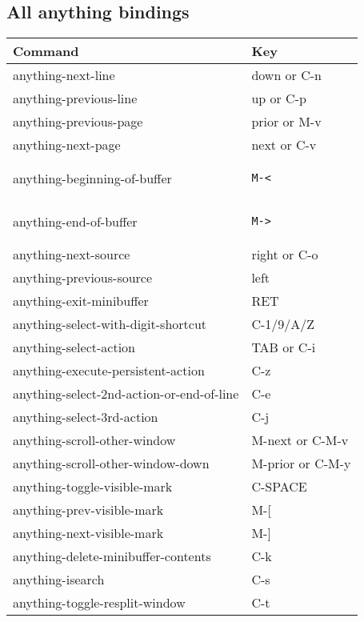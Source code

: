 \documentclass[a4paper,11pt]{article}
\begin{document}
\subsection{All anything bindings}
\label{sec:all-anyth-bind}

\begin{tabular}{| l | m{5cm} |}
  \hline
  Command & Key \\
  \hline
  anything-next-line & down or C-n \\
  \hline
  anything-previous-line & up or C-p \\
  \hline
  anything-previous-page & prior or M-v \\
  \hline
  anything-next-page & next or C-v \\
  \hline
  anything-beginning-of-buffer & 
\begin{verbatim}
M-<
\end{verbatim}
  \\
  \hline
  anything-end-of-buffer &
\begin{verbatim}
M->
\end{verbatim}
  \\
  \hline
  anything-next-source & right or C-o \\
  \hline
  anything-previous-source & left \\
  \hline
  anything-exit-minibuffer & RET \\
  \hline
  anything-select-with-digit-shortcut & C-1/9/A/Z \\
  \hline
  anything-select-action & TAB or C-i \\
  \hline
  anything-execute-persistent-action & C-z \\
  \hline
  anything-select-2nd-action-or-end-of-line & C-e \\
  \hline
  anything-select-3rd-action & C-j \\
  \hline
  anything-scroll-other-window & M-next or C-M-v \\
  \hline
  anything-scroll-other-window-down & M-prior or C-M-y \\
  \hline
  anything-toggle-visible-mark & C-SPACE \\
  \hline
  anything-prev-visible-mark & M-[ \\
  \hline
  anything-next-visible-mark & M-] \\
  \hline
  anything-delete-minibuffer-contents & C-k \\
  \hline
  anything-isearch & C-s \\
  \hline
  anything-toggle-resplit-window & C-t \\

\end{tabular}
\end{document}
